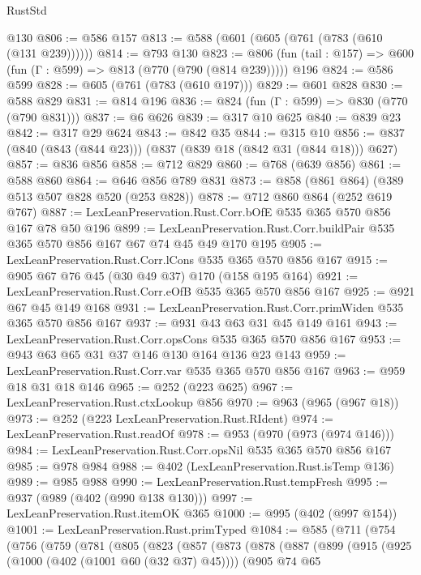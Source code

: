 \begin{lexlean}{RustStd}
\begin{coremodule}
    @130
@806 := @586 @157
@813 := @588 (@601 (@605 (@761 (@783 (@610 (@131 @239))))))
@814 := @793 @130
@823 := @806 (fun (tail : @157) => @600 (fun (Γ : @599) => @813 (@770 (@790 (@814 @239))))) @196
@824 := @586 @599
@828 := @605 (@761 (@783 (@610 @197)))
@829 := @601 @828
@830 := @588 @829
@831 := @814 @196
@836 := @824 (fun (Γ : @599) => @830 (@770 (@790 @831)))
@837 := @6 @626
@839 := @317 @10 @625
@840 := @839 @23
@842 := @317 @29 @624
@843 := @842 @35
@844 := @315 @10
@856 := @837 (@840 (@843 (@844 @23))) (@837 (@839 @18 (@842 @31 (@844 @18))) @627)
@857 := @836 @856
@858 := @712 @829
@860 := @768 (@639 @856)
@861 := @588 @860
@864 := @646 @856 @789 @831
@873 := @858 (@861 @864) (@389 @513 @507 @828 @520 (@253 @828))
@878 := @712 @860 @864 (@252 @619 @767)
@887 := LexLeanPreservation.Rust.Corr.bOfE @535 @365 @570 @856 @167 @78 @50 @196
@899 := LexLeanPreservation.Rust.Corr.buildPair @535 @365 @570 @856 @167 @67 @74 @45 @49 @170 @195
@905 := LexLeanPreservation.Rust.Corr.lCons @535 @365 @570 @856 @167
@915 := @905 @67 @76 @45 (@30 @49 @37) @170 (@158 @195 @164)
@921 := LexLeanPreservation.Rust.Corr.eOfB @535 @365 @570 @856 @167
@925 := @921 @67 @45 @149 @168
@931 := LexLeanPreservation.Rust.Corr.primWiden @535 @365 @570 @856 @167
@937 := @931 @43 @63 @31 @45 @149 @161
@943 := LexLeanPreservation.Rust.Corr.opsCons @535 @365 @570 @856 @167
@953 := @943 @63 @65 @31 @37 @146 @130 @164 @136 @23 @143
@959 := LexLeanPreservation.Rust.Corr.var @535 @365 @570 @856 @167
@963 := @959 @18 @31 @18 @146
@965 := @252 (@223 @625)
@967 := LexLeanPreservation.Rust.ctxLookup @856
@970 := @963 (@965 (@967 @18))
@973 := @252 (@223 LexLeanPreservation.Rust.RIdent)
@974 := LexLeanPreservation.Rust.readOf
@978 := @953 (@970 (@973 (@974 @146)))
@984 := LexLeanPreservation.Rust.Corr.opsNil @535 @365 @570 @856 @167
@985 := @978 @984
@988 := @402 (LexLeanPreservation.Rust.isTemp @136)
@989 := @985 @988
@990 := LexLeanPreservation.Rust.tempFresh
@995 := @937 (@989 (@402 (@990 @138 @130)))
@997 := LexLeanPreservation.Rust.itemOK @365
@1000 := @995 (@402 (@997 @154))
@1001 := LexLeanPreservation.Rust.primTyped
@1084 := @585
    (@711
      (@754
        (@756
          (@759
            (@781
              (@805
                (@823
                  (@857
                    (@873
                      (@878
                        (@887
                          (@899
                            (@915
                              (@925 (@1000 (@402 (@1001 @60 (@32 @37) @45))))
                              (@905
                                @74
                                @65

\end{coremodule}
\end{lexlean}
